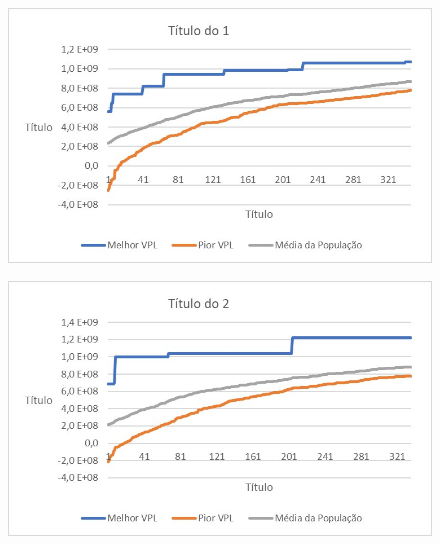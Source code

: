 \documentclass[12pt,a4paper]{report}
\begin{document}
\begin{figure}[H]
\centering

\includegraphics[scale=1]{ApE/AGRPCO1/1}

\end{figure}

\begin{figure}[H]
\centering

\includegraphics[scale=1]{ApE/AGRPCO1/2}

\end{figure}
\end{document}
